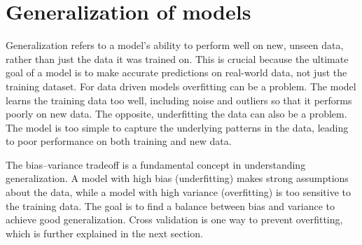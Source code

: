 \section{Generalization of models} \label{sec:generalization}
Generalization refers to a model's ability to perform well on new, unseen data, rather than just the data it was trained on. This is crucial because the ultimate goal of a model is to make accurate predictions on real-world data, not just the training dataset. For data driven models overfitting can be a problem. The model learns the training data too well, including noise and outliers so that it performs poorly on new data. The opposite, underfitting the data can also be a problem. The model is too simple to capture the underlying patterns in the data, leading to poor performance on both training and new data.  

The bias–variance tradeoff is a fundamental concept in understanding generalization. A model with high bias (underfitting) makes strong assumptions about the data, while a model with high variance (overfitting) is too sensitive to the training data. The goal is to find a balance between bias and variance to achieve good generalization. Cross validation is one way to prevent overfitting, which is further explained in the next section.